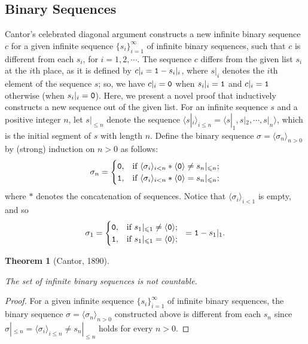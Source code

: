 \documentclass[12pt]{article}
\newtheorem{theorem}{Theorem}[]
\begin{document}
\subsection{Binary Sequences}
Cantor's celebrated diagonal argument constructs a new infinite binary sequence $c$ for a given infinite sequence $\{s_i\}_{i=1}^{\infty}$ of infinite binary sequences, such that $c$ is different from each $s_i$, for $i=1,2,\cdots$. The sequence $c$ differs from the given list $s_i$ at the $i$th place, as it is defined by $c|_i={\tt 1}-s_i|_i$, where $s|_i$ denotes the $i$th element of the sequence $s$; so, we have $c|_i={\tt 0}$ when $s_i|_i={\tt 1}$ and $c|_i={\tt 1}$ otherwise (when $s_i|_i={\tt 0}$).  Here, we present a novel proof that inductively constructs a new sequence out of the given list. For an infinite sequence $s$ and a positive integer $n$, let $s|_{\leqslant n}$ denote the sequence $\langle s|_i\rangle_{i\leqslant n}=\langle s|_1,s|_2,\cdots,s|_n\rangle$, which is the initial segment of $s$ with length $n$. Define the binary sequence $\sigma=\langle\sigma_n\rangle_{n>0}$ by (strong) induction on $n>0$ as follows:   $$\sigma_n=\begin{cases}
                                         {\tt 0}, & \mbox{if } \langle\sigma_i\rangle_{i<n}\ast\langle{\tt 0}\rangle\neq s_n|_{\leqslant n}; \\
                                         {\tt 1}, & \mbox{if } \langle\sigma_i\rangle_{i<n}\ast\langle{\tt 0}\rangle= s_n|_{\leqslant n};
                                       \end{cases}$$
where $\ast$ denotes the concatenation of sequences. Notice that $\langle\sigma_i\rangle_{i<1}$ is empty, and so
$$\sigma_1=\begin{cases}
                                         {\tt 0}, & \mbox{if } s_1|_{\leqslant 1}\neq \langle{\tt 0}\rangle; \\
                                         {\tt 1}, & \mbox{if } s_1|_{\leqslant 1}=
                                         \langle{\tt 0}\rangle;
                                       \end{cases}
 \;\; ={\tt 1}-s_1|_1.$$

\begin{theorem}[Cantor, 1890]
\,

\noindent
  The set of infinite binary sequences is not countable.
\end{theorem}

\begin{proof}

\noindent
  For a given infinite sequence $\{s_i\}_{i=1}^{\infty}$ of infinite binary sequences, the binary sequence $\sigma=\langle\sigma_n\rangle_{n>0}$ constructed above is different from each $s_n$ since $\sigma|_{\leqslant n}=\langle
  \sigma_i\rangle_{i\leqslant n}\neq
  s_n|_{\leqslant n}$ holds for every $n>0$.
  \end{proof}
\end{document}
